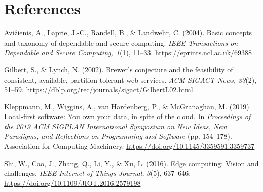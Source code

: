 \documentclass[11pt,a4paper]{article}
\begin{document}
\section*{References}
\begingroup
\setlength{\parindent}{-1.25em}
\setlength{\leftskip}{1.25em}
\setlength{\parskip}{0.5em}
Avi\v{z}ienis, A., Laprie, J.-C., Randell, B., \& Landwehr, C. (2004). Basic concepts and taxonomy of dependable and secure computing. \textit{IEEE Transactions on Dependable and Secure Computing, 1}(1), 11--33. \url{https://eprints.ncl.ac.uk/69388}

Gilbert, S., \& Lynch, N. (2002). Brewer's conjecture and the feasibility of consistent, available, partition-tolerant web services. \textit{ACM SIGACT News, 33}(2), 51--59. \url{https://dblp.org/rec/journals/sigact/GilbertL02.html}

Kleppmann, M., Wiggins, A., van Hardenberg, P., \& McGranaghan, M. (2019). Local-first software: You own your data, in spite of the cloud. In \textit{Proceedings of the 2019 ACM SIGPLAN International Symposium on New Ideas, New Paradigms, and Reflections on Programming and Software} (pp. 154--178). Association for Computing Machinery. \url{https://doi.org/10.1145/3359591.3359737}

Shi, W., Cao, J., Zhang, Q., Li, Y., \& Xu, L. (2016). Edge computing: Vision and challenges. \textit{IEEE Internet of Things Journal, 3}(5), 637--646. \url{https://doi.org/10.1109/JIOT.2016.2579198}
\endgroup
\end{document}
